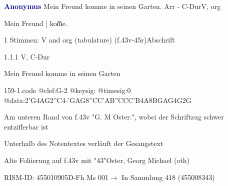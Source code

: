 \documentclass[twocolumn, 12pt]{book}
\begin{document}
\par \vspace{16pt} \textcolor{darkblue}{\textbf{Anonymus  }}\hfillplus{\textbf{[159]}}\newline Mein Freund komme in seinen Garten. Arr - C-Dur\newline V, org
\par \begin{itshape}[f.43v, at left:] Mein Freund | kom̅e.\end{itshape} 
\par \textcolor{darkblue}{}  1 Stimmen: V and org (tabulature)  (f.43v-45r)\newline Abschrift
\par 1.1.1  V, C-Dur\newline \begin{footnotesize} Mein Freund komme in seinen Garten \end{footnotesize}  
\begin{filecontents*}{159-1.code}
@clef:G-2
@keysig:
@timesig:0
@data:2'G4AG2''C4-'GAG{8''CC'AB}{''CCC'B}4A{8BG}{AG}4G2G
\end{filecontents*}
\newline %
\par Am unteren Rand von f.43v "G. M Oster.", wobei der Schriftzug schwer entzifferbar ist
\par Unterhalb des Notentextes verläuft der Gesangstext
\par Alte Foliierung auf f.43v mit "43"\newline Oster, Georg Michael  (oth)
\par RISM-ID: 455010905\newline D-Fh  Ms 001\newline $\rightarrow$ In Sammlung 418 (455008343)
      
\end{document}
